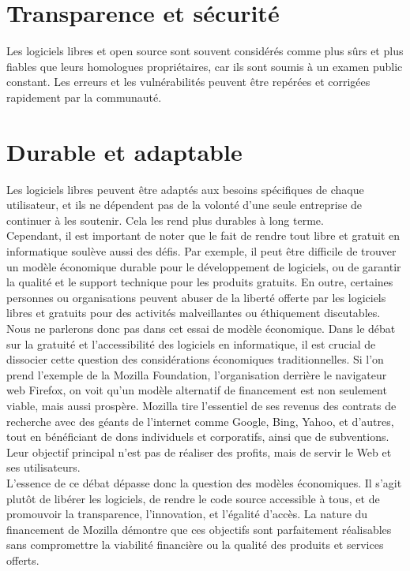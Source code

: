 \section{Transparence et sécurité} Les logiciels libres et open source sont souvent considérés comme plus sûrs et plus fiables que leurs homologues propriétaires, car ils sont soumis à un examen public constant. Les erreurs et les vulnérabilités peuvent être repérées et corrigées rapidement par la communauté.

\section{Durable et adaptable}  Les logiciels libres peuvent être adaptés aux besoins spécifiques de chaque utilisateur, et ils ne dépendent pas de la volonté d'une seule entreprise de continuer à les soutenir. Cela les rend plus durables à long terme.\\


Cependant, il est important de noter que le fait de rendre tout libre et gratuit en informatique soulève aussi des défis. Par exemple, il peut être difficile de trouver un modèle économique durable pour le développement de logiciels, ou de garantir la qualité et le support technique pour les produits gratuits. En outre, certaines personnes ou organisations peuvent abuser de la liberté offerte par les logiciels libres et gratuits pour des activités malveillantes ou éthiquement discutables.\\
Nous ne parlerons donc pas dans cet essai de modèle économique. Dans le débat sur la gratuité et l'accessibilité des logiciels en informatique, il est crucial de dissocier cette question des considérations économiques traditionnelles. Si l'on prend l'exemple de la Mozilla Foundation, l'organisation derrière le navigateur web Firefox, on voit qu'un modèle alternatif de financement est non seulement viable, mais aussi prospère. Mozilla tire l'essentiel de ses revenus des contrats de recherche avec des géants de l'internet comme Google, Bing, Yahoo, et d'autres, tout en bénéficiant de dons individuels et corporatifs, ainsi que de subventions. Leur objectif principal n'est pas de réaliser des profits, mais de servir le Web et ses utilisateurs.\\

L'essence de ce débat dépasse donc la question des modèles économiques. Il s'agit plutôt de libérer les logiciels, de rendre le code source accessible à tous, et de promouvoir la transparence, l'innovation, et l'égalité d'accès. La nature du financement de Mozilla démontre que ces objectifs sont parfaitement réalisables sans compromettre la viabilité financière ou la qualité des produits et services offerts.
